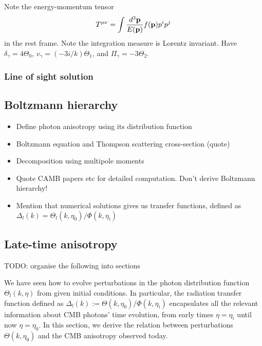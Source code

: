 Note the energy-momentum tensor
\begin{align}
	T^{\mu\nu} = \int \frac{d^3 \mathbf{p}}{E(\mathbf{p})} f(\mathbf{p}) p^i p^j
\end{align}
in the rest frame. Note the integration measure is Lorentz invariant. Have $\delta_\gamma = 4\Theta_0$, $v_\gamma = (-3i/k) \Theta_1$, and $\Pi_\gamma = -3\Theta_2$.



\subsubsection*{Line of sight solution} \label{section:line_of_sight_solution}
\subsection{Boltzmann hierarchy} \label{section:boltzmann_hierarchy}


\begin{itemize}
	\item Define photon anisotropy using its distribution function
	\item Boltzmann equation and Thompson scattering cross-section (quote)
	\item Decomposition using multipole moments
	\item Quote CAMB papers etc for detailed computation. Don't derive Boltzmann hierarchy!
	\item Mention that numerical solutions gives us transfer functions, defined as $\Delta_l (k) = \Theta_l(k,\eta_0) / \Phi(k,\eta_i)$
\end{itemize}


\subsection{Late-time anisotropy}

TODO: organise the following into sections

We have seen how to evolve perturbations in the photon distribution function $\Theta_l(k,\eta)$ from given initial conditions. In particular, the radiation transfer function defined as $\Delta_l(k) := \Theta(k,\eta_0) / \Phi(k,\eta_i) $ encapsulates all the relevant information about CMB photons' time evolution, from early times $\eta=\eta_i$ until now $\eta=\eta_0$. In this section, we derive the relation between perturbations $\Theta(k,\eta_0)$ and the CMB anisotropy observed today.

